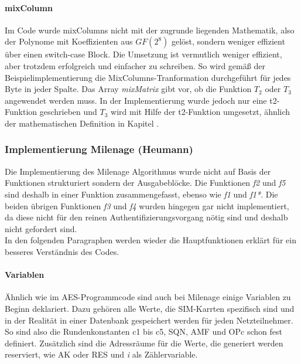 		\paragraph{mixColumn}
		Im Code wurde mixColumns nicht mit der zugrunde liegenden Mathematik, also der
		Polynome mit Koeffizienten aus $GF(2^8)$ gelöst, sondern weniger effizient über
		einen switch-case Block. Die Umsetzung ist vermutlich weniger effizient, aber trotzdem
		erfolgreich und einfacher zu schreiben.
		So wird gemäß der Beispielimplementierung die MixColumns-Tranformation
		durchgeführt für jedes Byte in jeder Spalte. Das Array \emph{mixMatrix} gibt vor,
		ob die Funktion $T_2$ oder $T_3$ angewendet werden muss. In der Implementierung
		wurde jedoch nur eine t2-Funktion geschrieben und $T_3$ wird mit Hilfe der 
		t2-Funktion umgesetzt, ähnlich der mathematischen Definition in Kapitel
		.

	\subsubsection{Implementierung Milenage (Heumann)}
	\label{implementierung-milenage}
	Die Implementierung des Milenage Algorithmus wurde nicht auf Basis der Funktionen
	strukturiert sondern der Ausgabeblöcke. Die Funktionen \emph{f2} und \emph{f5} sind
	deshalb in einer Funktion zusammengefasst, ebenso wie \emph{f1} und \emph{f1*}. Die
	beiden übrigen Funktionen \emph{f3} und \emph{f4} wurden hingegen gar nicht implementiert,
	da diese nicht für den reinen Authentifizierungsvorgang nötig sind und deshalb nicht
	gefordert sind. \\
	In den folgenden Paragraphen werden wieder die Hauptfunktionen erklärt für ein besseres
	Verständnis des Codes.
	
		\paragraph{Variablen}
		Ähnlich wie im AES-Programmcode sind auch bei Milenage einige Variablen zu Beginn
		deklariert. Dazu gehören alle Werte, die SIM-Karrten spezifisch sind und in der
		Realität in einer Datenbank gespeichert werden für jeden Netzteilnehmer. So sind also
		die Rundenkonstanten c1 bis c5, SQN, AMF und OPc schon fest definiert. Zusätzlich sind
		die Adressräume für die Werte, die generiert werden reserviert, wie AK oder RES und \emph{i}
		als Zählervariable.
		
